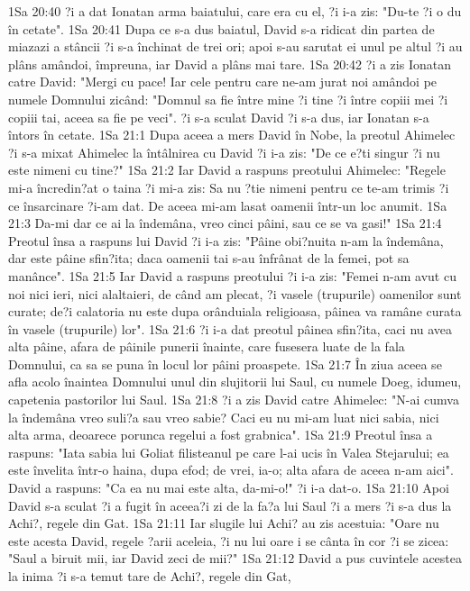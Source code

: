 1Sa 20:40  ?i a dat Ionatan arma baiatului, care era cu el, ?i i-a zis: "Du-te ?i o du în cetate".
1Sa 20:41  Dupa ce s-a dus baiatul, David s-a ridicat din partea de miazazi a stâncii ?i s-a închinat de trei ori; apoi s-au sarutat ei unul pe altul ?i au plâns amândoi, împreuna, iar David a plâns mai tare.
1Sa 20:42  ?i a zis Ionatan catre David: "Mergi cu pace! Iar cele pentru care ne-am jurat noi amândoi pe numele Domnului zicând: "Domnul sa fie între mine ?i tine ?i între copiii mei ?i copiii tai, aceea sa fie pe veci". ?i s-a sculat David ?i s-a dus, iar Ionatan s-a întors în cetate.
1Sa 21:1  Dupa aceea a mers David în Nobe, la preotul Ahimelec ?i s-a mixat Ahimelec la întâlnirea cu David ?i i-a zis: "De ce e?ti singur ?i nu este nimeni cu tine?"
1Sa 21:2  Iar David a raspuns preotului Ahimelec: "Regele mi-a încredin?at o taina ?i mi-a zis: Sa nu ?tie nimeni pentru ce te-am trimis ?i ce însarcinare ?i-am dat. De aceea mi-am lasat oamenii într-un loc anumit.
1Sa 21:3  Da-mi dar ce ai la îndemâna, vreo cinci pâini, sau ce se va gasi!"
1Sa 21:4  Preotul însa a raspuns lui David ?i i-a zis: "Pâine obi?nuita n-am la îndemâna, dar este pâine sfin?ita; daca oamenii tai s-au înfrânat de la femei, pot sa manânce".
1Sa 21:5  Iar David a raspuns preotului ?i i-a zis: "Femei n-am avut cu noi nici ieri, nici alaltaieri, de când am plecat, ?i vasele (trupurile) oamenilor sunt curate; de?i calatoria nu este dupa orânduiala religioasa, pâinea va ramâne curata în vasele (trupurile) lor".
1Sa 21:6  ?i i-a dat preotul pâinea sfin?ita, caci nu avea alta pâine, afara de pâinile punerii înainte, care fusesera luate de la fala Domnului, ca sa se puna în locul lor pâini proaspete.
1Sa 21:7  În ziua aceea se afla acolo înaintea Domnului unul din slujitorii lui Saul, cu numele Doeg, idumeu, capetenia pastorilor lui Saul.
1Sa 21:8  ?i a zis David catre Ahimelec: "N-ai cumva la îndemâna vreo suli?a sau vreo sabie? Caci eu nu mi-am luat nici sabia, nici alta arma, deoarece porunca regelui a fost grabnica".
1Sa 21:9  Preotul însa a raspuns: "Iata sabia lui Goliat filisteanul pe care l-ai ucis în Valea Stejarului; ea este învelita într-o haina, dupa efod; de vrei, ia-o; alta afara de aceea n-am aici". David a raspuns: "Ca ea nu mai este alta, da-mi-o!" ?i i-a dat-o.
1Sa 21:10  Apoi David s-a sculat ?i a fugit în aceea?i zi de la fa?a lui Saul ?i a mers ?i s-a dus la Achi?, regele din Gat.
1Sa 21:11  Iar slugile lui Achi? au zis acestuia: "Oare nu este acesta David, regele ?arii aceleia, ?i nu lui oare i se cânta în cor ?i se zicea: "Saul a biruit mii, iar David zeci de mii?"
1Sa 21:12  David a pus cuvintele acestea la inima ?i s-a temut tare de Achi?, regele din Gat,
